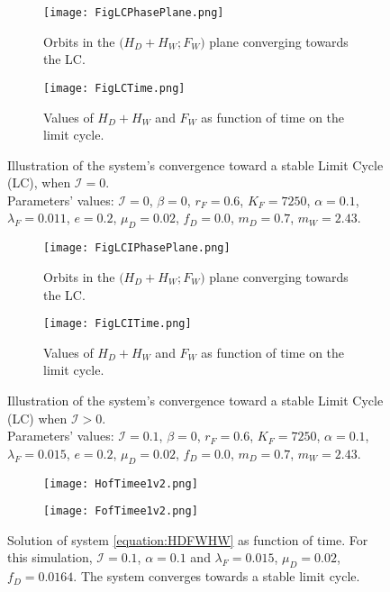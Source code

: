 \documentclass{article}
\newcommand{\lfw}{\lambda_{F}}
\newcommand{\lfw}{\lambda_{F}}
\newcommand{\cI}{\mathcal{I}}
\theoremstyle{definition}
\theoremstyle{remark}
\begin{document}
\begin{figure}[!ht]
\begin{subfigure}{1\textwidth}
\centering
\texttt{[image: FigLCPhasePlane.png]}
\caption{\centering Orbits in the $\Big(H_D + H_W ; F_W\Big)$ plane converging towards the LC.}
\label{fig:LCI0, 1}
\end{subfigure}
\begin{subfigure}{1\textwidth}
\centering
\texttt{[image: FigLCTime.png]}
\caption{\centering Values of $H_D + H_W$ and $F_W$ as function of time on the limit cycle.}
\label{fig:LCI0, 2}
\end{subfigure}
\caption{Illustration of the system's convergence toward a stable Limit Cycle (LC), when $\cI =0$. \\
Parameters' values: $\cI = 0$, $\beta = 0$, $r_F = 0.6$, $K_F = 7250$, $\alpha = 0.1$, $\lfw = 0.011$, $e = 0.2$, $\mu_D = 0.02$, $f_D = 0.0$, $m_D = 0.7$, $m_W = 2.43$.}
\label{fig:LCI0}
\end{figure}



\begin{figure}[!ht]
\begin{subfigure}{1\textwidth}
\centering
\texttt{[image: FigLCIPhasePlane.png]}
\caption{\centering Orbits in the $\Big(H_D + H_W ; F_W\Big)$ plane converging towards the LC.}
\label{fig:LCI, 1}
\end{subfigure}
\begin{subfigure}{1\textwidth}
\centering
\texttt{[image: FigLCITime.png]}
\caption{\centering Values of $H_D + H_W$ and $F_W$ as function of time on the limit cycle.}
\label{fig:LCI, 2}
\end{subfigure}
\caption{ Illustration of the system's convergence toward a stable Limit Cycle (LC) when $\cI > 0$. \\
Parameters' values: $\cI = 0.1$, $\beta = 0$, $r_F = 0.6$, $K_F = 7250$, $\alpha = 0.1$, $\lfw = 0.015$, $e = 0.2$, $\mu_D = 0.02$, $f_D = 0.0$, $m_D = 0.7$, $m_W = 2.43$.}
\label{fig:LCI}
\end{figure}

\begin{figure}[!ht]
\centering
\begin{subfigure}{1\textwidth}
\centering
\texttt{[image: HofTimee1v2.png]}
\end{subfigure}
\begin{subfigure}{1\textwidth}
\centering
\texttt{[image: FofTimee1v2.png]}
\end{subfigure}
\caption{Solution of system \eqref{equation:HDFWHW} as function of time. For this simulation, $\cI = 0.1$, $\alpha=0.1$ and $\lfw = 0.015$, $\mu_D = 0.02$, $f_D = 0.0164$. The system converges towards a stable limit cycle.}
\label{fig:1d trajectory}
\end{figure}
\end{document}
